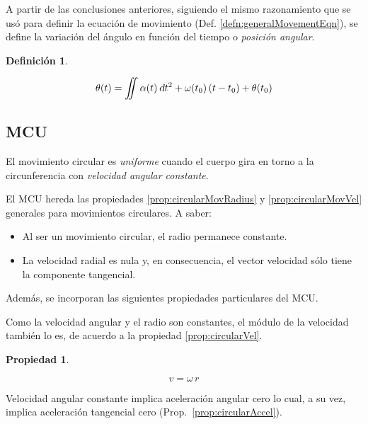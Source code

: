 \documentclass[a5paper,12pt,twoside]{book}
\newtheorem{defn}{{Definición}}[chapter]
\newtheorem{prop}{{Propiedad}}[chapter]
\begin{document}
A partir de las conclusiones anteriores, siguiendo el mismo razonamiento que se usó para definir la ecuación de movimiento (Def. \ref{defn:generalMovementEqn}), se define la variación del ángulo en función del tiempo o \emph{posición angular}.

\begin{mdframed}[style=MyFrame1]
    \begin{defn}
        \label{defn:anglePosition}
    \end{defn}
    \begin{equation*}
        \theta(t) = \iint \alpha(t) \, \textsl{d} t^2 + \omega (t_0) \left(t-t_0\right) + \theta(t_0)
    \end{equation*}
\end{mdframed}


\subsection{MCU}
El movimiento circular es \emph{uniforme} cuando el cuerpo gira en torno a la circunferencia con \emph{velocidad angular constante}.

El MCU hereda las propiedades \ref{prop:circularMovRadius} y \ref{prop:circularMovVel} generales para movimientos circulares. A saber:
\begin{itemize}
    \item Al ser un movimiento circular, el radio permanece constante.
    
    \item La velocidad radial es nula y, en consecuencia, el vector velocidad sólo tiene la componente tangencial.
\end{itemize}

Además, se incorporan las siguientes propiedades particulares del MCU.

Como la velocidad angular y el radio son constantes, el módulo de la velocidad también lo es, de acuerdo a la propiedad \ref{prop:circularVel}.

\begin{mdframed}[style=MyFrame1]
    \begin{prop}
    \end{prop}
    \begin{equation*}
        v = \omega \, r
    \end{equation*}
\end{mdframed}

Velocidad angular constante implica aceleración angular cero lo cual, a su vez, implica aceleración tangencial cero (Prop.~\ref{prop:circularAccel}).
\end{document}

